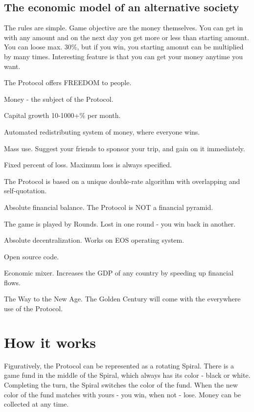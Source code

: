 \subsection*{The economic model of an alternative society}

The rules are simple. Game objective are the money themselves. You can get in with any amount and on the next day you get more or less than starting amount. You can loose max. 30\%, but if you win, you starting amonut can be multiplied by many times. Interesting feature is that you can get your money anytime you want.


\begin{DoxyItemize}
\item The Protocol offers F\+R\+E\+E\+D\+OM to people.
\item Money -\/ the subject of the Protocol.
\item Capital growth 10-\/1000+\% per month.
\item Automated redistributing system of money, where everyone wins.
\item Mass use. Suggest your friends to sponsor your trip, and gain on it immediately.
\item Fixed percent of loss. Maximum loss is always specified.
\item The Protocol is based on a unique double-\/rate algorithm with overlapping and self-\/quotation.
\item Absolute financial balance. The Protocol is N\+OT a financial pyramid.
\item The game is played by Rounds. Lost in one round -\/ you win back in another.
\item Absolute decentralization. Works on E\+OS operating system.
\item Open source code.
\item Economic mixer. Increases the G\+DP of any country by speeding up financial flows.
\item The Way to the New Age. The Golden Century will come with the everywhere use of the Protocol.
\end{DoxyItemize}

\section*{How it works}

Figuratively, the Protocol can be represented as a rotating Spiral. There is a game fund in the middle of the Spiral, which always has its color -\/ black or white. Completing the turn, the Spiral switches the color of the fund. When the new color of the fund matches with yours -\/ you win, when not -\/ lose. Money can be collected at any time.

